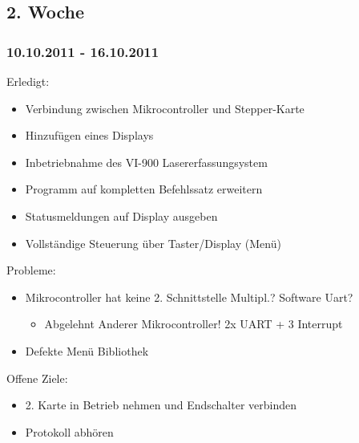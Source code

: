 \documentclass[ngerman]{beamer}
\begin{document}
\subsection{2. Woche}
\begin{frame}\frametitle{10.10.2011 - 16.10.2011}
Erledigt:
\begin{itemize}
\item Verbindung zwischen Mikrocontroller und Stepper-Karte 
\item Hinzufügen eines Displays 
\item Inbetriebnahme des VI-900 Lasererfassungsystem 
\item Programm auf kompletten Befehlssatz erweitern 
\item Statusmeldungen auf Display ausgeben 
\item Vollständige Steuerung über Taster/Display (Menü) 
\end{itemize}
Probleme: 
\begin{itemize}
\item Mikrocontroller hat keine 2. Schnittstelle Multipl.? Software Uart? 
\begin{itemize}
\item Abgelehnt Anderer Mikrocontroller! 2x UART + 3 Interrupt 
\end{itemize}
\item Defekte Menü Bibliothek 
\end{itemize}
Offene Ziele: 
\begin{itemize}
\item 2. Karte in Betrieb nehmen und Endschalter verbinden 
\item Protokoll abhören
\end{itemize}
\end{frame}
\end{document}
